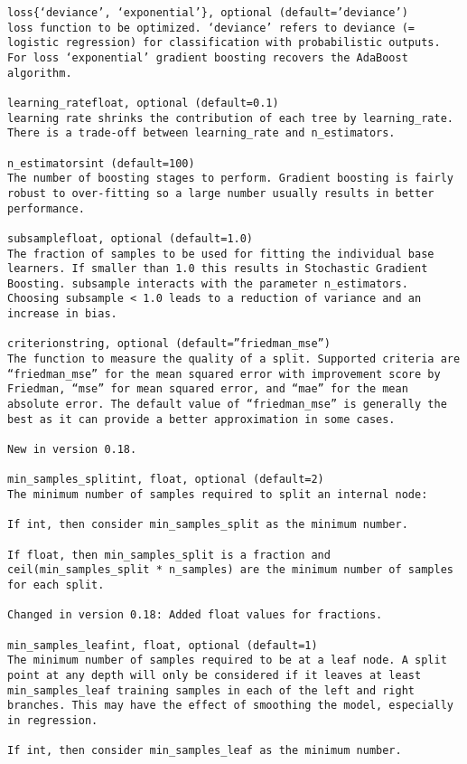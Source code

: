 \documentclass[12pt]{article}
\begin{document}
\begin{verbatim}
loss{‘deviance’, ‘exponential’}, optional (default=’deviance’)
loss function to be optimized. ‘deviance’ refers to deviance (= logistic regression) for classification with probabilistic outputs. For loss ‘exponential’ gradient boosting recovers the AdaBoost algorithm.

learning_ratefloat, optional (default=0.1)
learning rate shrinks the contribution of each tree by learning_rate. There is a trade-off between learning_rate and n_estimators.

n_estimatorsint (default=100)
The number of boosting stages to perform. Gradient boosting is fairly robust to over-fitting so a large number usually results in better performance.

subsamplefloat, optional (default=1.0)
The fraction of samples to be used for fitting the individual base learners. If smaller than 1.0 this results in Stochastic Gradient Boosting. subsample interacts with the parameter n_estimators. Choosing subsample < 1.0 leads to a reduction of variance and an increase in bias.

criterionstring, optional (default=”friedman_mse”)
The function to measure the quality of a split. Supported criteria are “friedman_mse” for the mean squared error with improvement score by Friedman, “mse” for mean squared error, and “mae” for the mean absolute error. The default value of “friedman_mse” is generally the best as it can provide a better approximation in some cases.

New in version 0.18.

min_samples_splitint, float, optional (default=2)
The minimum number of samples required to split an internal node:

If int, then consider min_samples_split as the minimum number.

If float, then min_samples_split is a fraction and ceil(min_samples_split * n_samples) are the minimum number of samples for each split.

Changed in version 0.18: Added float values for fractions.

min_samples_leafint, float, optional (default=1)
The minimum number of samples required to be at a leaf node. A split point at any depth will only be considered if it leaves at least min_samples_leaf training samples in each of the left and right branches. This may have the effect of smoothing the model, especially in regression.

If int, then consider min_samples_leaf as the minimum number.


\end{verbatim}
\end{document}
